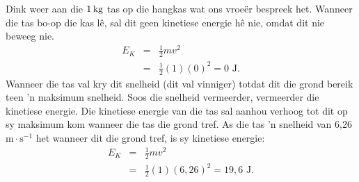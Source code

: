       \label{m38785*id66902}Dink weer aan die $1\phantom{\rule{2pt}{0ex}}\text{kg}$ tas op die hangkas wat ons vroe\"{e}r bespreek het. Wanneer die tas bo-op die kas lê, sal dit geen kinetiese energie hê nie, omdat dit nie beweeg nie.
\begin{eqnarray*}
E_{K} &=& \frac{1}{2}mv^{2} \\
& = & \frac{1}{2}(1)(0)^{2} = 0 \text{ J}.
\end{eqnarray*}
Wanneer die tas val kry dit snelheid (dit val vinniger) totdat dit die grond bereik teen  'n maksimum snelheid. Soos die snelheid vermeerder, vermeerder die kinetiese energie. Die kinetiese energie van die tas sal aanhou verhoog tot dit op sy maksimum kom wanneer die tas die grond tref. As die tas  'n snelheid van 6,26 $\text{m}  \cdot \text{s}^{-1}$ het wanneer dit die grond tref, is sy kinetiese energie:
\begin{eqnarray*}
E_{K} &=& \frac{1}{2}mv^{2} \\
& = & \frac{1}{2}(1)(6,26)^{2} = 19,6 \text{ J}.
\end{eqnarray*}


